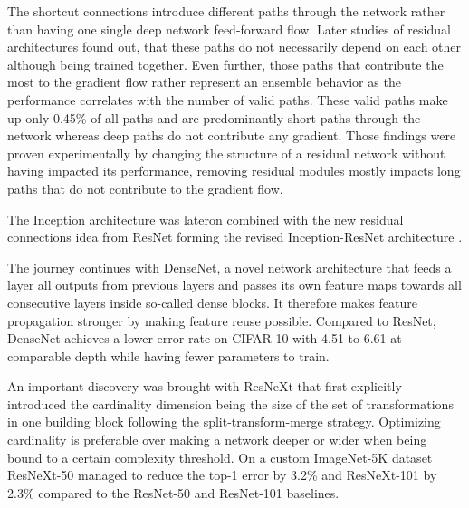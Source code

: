The shortcut connections introduce different paths through the network rather than having one single deep network feed-forward flow. Later studies of residual architectures found out, that these paths do not necessarily depend on each other although being trained together. Even further, those paths that contribute the most to the gradient flow rather represent an ensemble behavior as the performance correlates with the number of valid paths. These valid paths make up only 0.45\% of all paths and are predominantly short paths through the network whereas deep paths do not contribute any gradient. Those findings were proven experimentally by changing the structure of a residual network without having impacted its performance, removing residual modules mostly impacts long paths that do not contribute to the gradient flow. \cite{AndreasVeit.2016}

The Inception architecture was lateron combined with the new residual connections idea from ResNet forming the revised Inception-ResNet architecture \cite{ChristianSzegedy.2016}.

The journey continues with DenseNet, a novel network architecture that feeds a layer all outputs from previous layers and passes its own feature maps towards all consecutive layers inside so-called dense blocks. It therefore makes feature propagation stronger by making feature reuse possible. Compared to ResNet, DenseNet achieves a lower error rate on CIFAR-10 \cite{AlexKrizhevsky.2009} with 4.51 to 6.61 at comparable depth while having fewer parameters to train. \cite{GaoHuang.2016}

An important discovery was brought with ResNeXt that first explicitly introduced the cardinality dimension being the size of the set of transformations in one building block following the split-transform-merge strategy. Optimizing cardinality is preferable over making a network deeper or wider when being bound to a certain complexity threshold. On a custom ImageNet-5K dataset ResNeXt-50 managed to reduce the top-1 error by 3.2\% and ResNeXt-101 by 2.3\% compared to the ResNet-50 and ResNet-101 baselines. \cite{SainingXie.2017}


